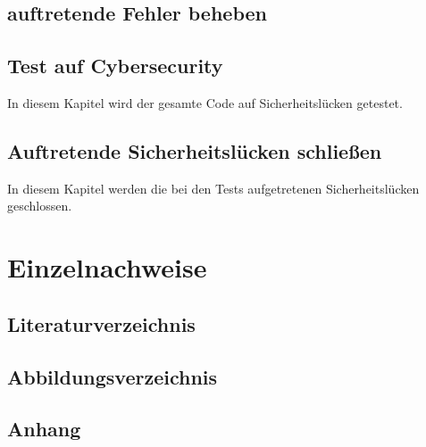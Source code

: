\documentclass[]{article}
\begin{document}
\subsection{auftretende Fehler beheben}
\subsection{Test auf Cybersecurity}
In diesem Kapitel wird der gesamte Code auf Sicherheitslücken getestet.
\subsection{Auftretende Sicherheitslücken schließen}
In diesem Kapitel werden die bei den Tests aufgetretenen Sicherheitslücken geschlossen.

\section{Einzelnachweise}
\subsection{Literaturverzeichnis}
\subsection{Abbildungsverzeichnis}
\subsection{Anhang}
\end{document}
